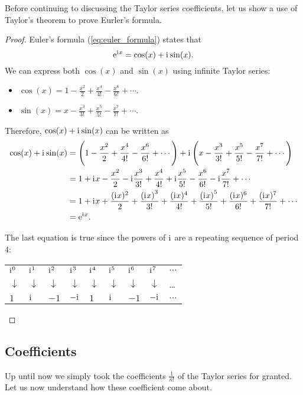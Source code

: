 Before continuing to discussing the Taylor series coefficients, let us show a use of Taylor's theorem to prove Eurler's formula.
\begin{proof}
  Euler's formula (\autoref{eq:euler_formula}) states that
  \[
    \mathrm{e}^{\mathrm{i}\mkern1mu x} = \cos(x) + \mathrm{i}\mkern1mu\sin(x).
  \]
  We can express both $\cos(x)$ and $\sin(x)$ using infinite Taylor series:
  \begin{itemize}
    \item $\cos(x) = 1-\frac{x^{2}}{2}+\frac{x^{4}}{4!}-\frac{x^{6}}{6!}+\cdots$.
    \item $\sin(x) = x-\frac{x^{3}}{3!}+\frac{x^{5}}{5!}-\frac{x^{7}}{7!}+\cdots$.
  \end{itemize}
  Therefore, $\cos(x)+\mathrm{i}\mkern1mu\sin(x)$ can be written as
  \begin{align*}
    \cos(x) + \mathrm{i}\mkern1mu\sin(x) &= \left(1-\frac{x^{2}}{2}+\frac{x^{4}}{4!}-\frac{x^{6}}{6!}+\cdots\right) + \mathrm{i}\mkern1mu\left(x-\frac{x^{3}}{3!}+\frac{x^{5}}{5!}-\frac{x^{7}}{7!}+\cdots\right)\\
                         &= 1+\mathrm{i}\mkern1mu x - \frac{x^{2}}{2} -\mathrm{i}\mkern1mu\frac{x^{3}}{3!} + \frac{x^{4}}{4!} + \mathrm{i}\mkern1mu\frac{x^{5}}{5!} - \frac{x^{6}}{6!} - \mathrm{i}\mkern1mu\frac{x^{7}}{7!} + \cdots\\
                         &= 1 +\mathrm{i}\mkern1mu x + \frac{(\mathrm{i}\mkern1mu x)^{2}}{2} + \frac{\left(\mathrm{i}\mkern1mu x\right)^{3}}{3!} + \frac{(\mathrm{i}\mkern1mu x)^{4}}{4!} + \frac{\left(\mathrm{i}\mkern1mu x\right)^{5}}{5!} + \frac{(\mathrm{i}\mkern1mu x)^{6}}{6!} + \frac{(\mathrm{i}\mkern1mu x)^{7}}{7!} + \cdots\\
                         &= \mathrm{e}^{\mathrm{i}\mkern1mu x}.
  \end{align*}

  The last equation is true since the powers of $\mathrm{i}\mkern1mu$ are a repeating sequence of period $4$:
  
  \centering
  \begin{tabular}{lllllllll}
    $\mathrm{i}\mkern1mu^{0}$ & $\mathrm{i}\mkern1mu^{1}$ & $\mathrm{i}\mkern1mu^{2}$ & $\mathrm{i}\mkern1mu^{3}$ & $\mathrm{i}\mkern1mu^{4}$ & $\mathrm{i}\mkern1mu^{5}$ & $\mathrm{i}\mkern1mu^{6}$ & $\mathrm{i}\mkern1mu^{7}$ & $\dots$\\
    $\downarrow$ & $\downarrow$ & $\downarrow$ & $\downarrow$ & $\downarrow$ & $\downarrow$ & $\downarrow$ & $\downarrow$ & \dots\\
    $1$ & $\mathrm{i}\mkern1mu$ & $-1$ & $-\mathrm{i}\mkern1mu$ & $1$ & $\mathrm{i}\mkern1mu$ & $-1$ & $-\mathrm{i}\mkern1mu$ & $\dots$\\
  \end{tabular}
\end{proof}

\subsection{Coefficients}
Up until now we simply took the coefficients $\frac{1}{n!}$ of the Taylor series for granted. Let us now understand how these coefficient come about.

